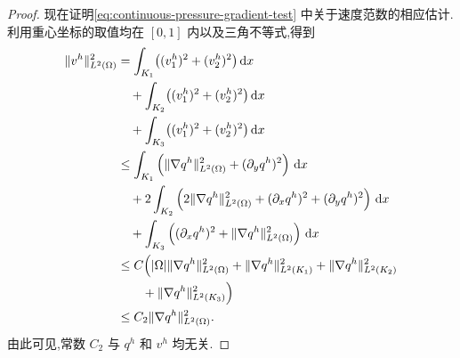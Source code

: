 \begin{proof}
现在证明\cref{eq:continuous-pressure-gradient-test} 中关于速度范数的相应估计.利用重心坐标的取值均在 $[0,1]$ 内以及三角不等式,得到
\begin{equation}\label{eq:taylor-hood-k2-velocity-bound}
\begin{aligned}
  \|v^h\|_{L^2(\Omega)}^2
  &=\int_{K_1}\bigl((v_1^h)^2+(v_2^h)^2\bigr)\,\mathrm{d}x\\
  &\quad+\int_{K_2}\bigl((v_1^h)^2+(v_2^h)^2\bigr)\,\mathrm{d}x\\
  &\quad+\int_{K_3}\bigl((v_1^h)^2+(v_2^h)^2\bigr)\,\mathrm{d}x\\
  &\le \int_{K_1}\left(\|\nabla q^h\|_{L^2(\Omega)}^2
                        +(\partial_yq^h)^2\right)\,\mathrm{d}x\\
  &\quad+2\int_{K_2}\left(2\|\nabla q^h\|_{L^2(\Omega)}^2
                        +(\partial_xq^h)^2+(\partial_yq^h)^2\right)\,\mathrm{d}x\\
  &\quad+\int_{K_3}\left((\partial_xq^h)^2
                        +\|\nabla q^h\|_{L^2(\Omega)}^2\right)\,\mathrm{d}x\\
  &\le C\Bigl(|\Omega|\|\nabla q^h\|_{L^2(\Omega)}^2
       +\|\nabla q^h\|_{L^2(K_1)}^2+\|\nabla q^h\|_{L^2(K_2)}^2\\
       &\qquad+\|\nabla q^h\|_{L^2(K_3)}^2\Bigr)\\
  &\le C_2\|\nabla q^h\|_{L^2(\Omega)}^2.
\end{aligned}
\end{equation}
由此可见,常数 $C_2$ 与 $q^h$ 和 $v^h$ 均无关.


\end{proof}
